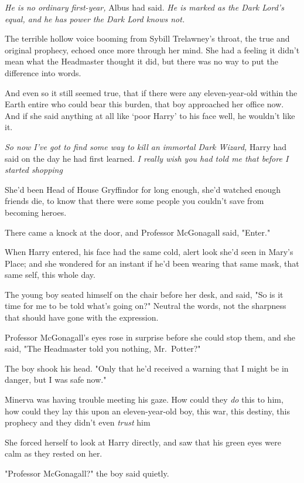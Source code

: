 \emph{He is no ordinary first-year,} Albus had said. \emph{He is marked as the
Dark Lord's equal, and he has power the Dark Lord knows not.}

The terrible hollow voice booming from Sybill Trelawney's throat, the true and
original prophecy, echoed once more through her mind. She had a feeling it
didn't mean what the Headmaster thought it did, but there was no way to put the
difference into words.

And even so it still seemed true, that if there were any eleven-year-old within
the Earth entire who could bear this burden, that boy approached her office
now. And if she said anything at all like `poor Harry' to his face{\el}
well, he wouldn't like it.

\emph{So now I've got to find some way to kill an immortal Dark Wizard,} Harry
had said on the day he had first learned. \emph{I really wish you had told me
that before I started shopping{\el}}

She'd been Head of House Gryffindor for long enough, she'd watched enough
friends die, to know that there were some people you couldn't save from
becoming heroes.

There came a knock at the door, and Professor McGonagall said, "Enter."

When Harry entered, his face had the same cold, alert look she'd seen in Mary's
Place; and she wondered for an instant if he'd been wearing that same mask,
that same self, this whole day.

The young boy seated himself on the chair before her desk, and said, "So is it
time for me to be told what's going on?" Neutral the words, not the sharpness
that should have gone with the expression.

Professor McGonagall's eyes rose in surprise before she could stop them, and
she said, "The Headmaster told you nothing, Mr.~Potter?"

The boy shook his head. "Only that he'd received a warning that I might be in
danger, but I was safe now."

Minerva was having trouble meeting his gaze. How could they \emph{do} this to
him, how could they lay this upon an eleven-year-old boy, this war, this
destiny, this prophecy{\el} and they didn't even \emph{trust} him{\el}

She forced herself to look at Harry directly, and saw that his green eyes were
calm as they rested on her.

"Professor McGonagall?" the boy said quietly.

